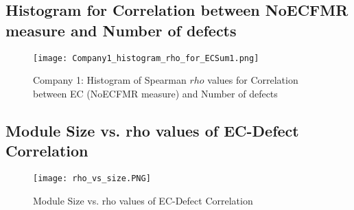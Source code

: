 \documentclass[times]{smrauth}
\begin{document}
\begin{table*}[ht]
\caption{Spearman Correlation Results of the Process Metrics} 
\label {tab:Correlations} 
\begin{center}
\end{center}
\end{table*}


\subsection{Histogram for Correlation between NoECFMR measure and Number of  defects}

\begin{figure}[h]
\centering
\texttt{[image: Company1\_histogram\_rho\_for\_ECSum1.png]}
\caption{Company 1: Histogram of Spearman $rho$ values for Correlation between EC (NoECFMR measure) and Number of defects}
\label{Company1_histogram_rho_noecfmr}	
\end{figure}


\newpage


\subsection{Module Size vs. rho values of EC-Defect Correlation}

\begin{figure*}[!h]
\centering
\texttt{[image: rho\_vs\_size.PNG]}
\caption{Module Size vs. rho values of EC-Defect Correlation}
\label{size_vs_correlation}	
\end{figure*}

\begin{table*}[ht]
\caption{Spearman Correlation Results} 
\label {tab:size_vs_correlation} 
\begin{center}
\end{center}
\end{table*}
\end{document}
